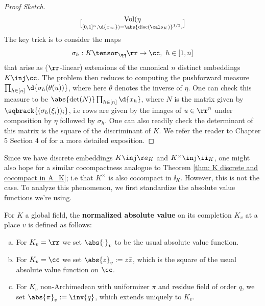 \documentclass[11pt, x11names, openany]{book}
\begin{document}
\begin{example}
\begin{proof}[Proof Sketch]
        \begin{equation*}
            \vol(\eta \brack{[0, 1]^n}, \d{x_\infty}) = \abs{\disc(\calo_K)}^{1/2}.
        \end{equation*}
        The key trick is to consider the maps
        \begin{equation*}
            \sigma_h : K \tensor_\qq \rr \to \cc, \ h \in [1, n]
        \end{equation*}
        that arise as ($\rr$-linear) extensions of the canonical $n$ distinct embeddings $K \inj \cc$. The problem then reduces to computing the pushforward measure $\prod_{h \in [n]} \d{\sigma_h(\theta(u))}$, where here $\theta$ denotes the inverse of $\eta$. One can check this measure to be $\abs{ \det(N)} \prod_{h \in [n]} \d{x_h}$, where $N$ is the matrix given by $\sqbrack{(\sigma_h(\xi_i))_i}$, i.e rows are given by the images of $u \in \rr^n$ under composition by $\eta$ followed by $\sigma_h$. One can also readily check the determinant of this matrix is the square of the discriminant of $K$. We refer the reader to Chapter 5 Section 4 of \cite{weil1974basic} for a more detailed exposition.
    \end{proof}
\end{example}

 Since we have discrete embeddings $K \inj \aa_K$ and $K^\times \inj \ii_K$, one might also hope for a similar cocompactness analogue to Theorem \ref{thm: K discrete and cocompact in A_K}; i.e that $K^\times$ is also cocompact in $\ii_K$. However, this is not the case. To analyze this phenomenon, we first standardize the absolute value functions we're using.
\begin{defn}
    \label{def: normalized absolute values}
For $K$ a global field, the \textbf{normalized absolute value} on its completion $K_v$ at a place $v$ is defined as follows:
\begin{enumerate}[(a)]
    \item For $K_v = \rr$ we set $\abs{\cdot}_v$ to be the usual absolute value function.
    \item For $K_v = \cc$ we set $\abs{z}_v := z \bar{z}$, which is the square of the usual absolute value function on $\cc$.
    \item For $K_v$ non-Archimedean with uniformizer $\pi$ and residue field of order $q$, we set $\abs{\pi}_v := \inv{q}$, which extends uniquely to $K_v$. 
\end{enumerate}
\end{defn}
\end{document}
